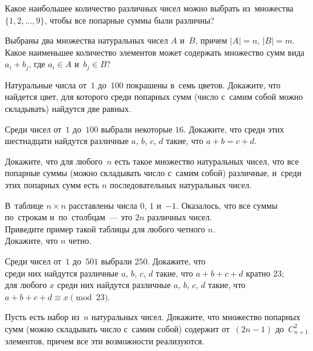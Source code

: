 


\begingroup
    \def\abs#1{\lvert #1 \rvert}%

\begin{problems}

\item
Какое наибольшее количество различных чисел можно выбрать из~множества
$\{ 1, 2, \ldots, 9 \}$, чтобы все попарные суммы были различны?

\item
Выбраны два множества натуральных чисел $A$ и~$B$, причем $\abs{A} = n$,
$\abs{B} = m$.
Какое наименьшее количество элементов может содержать множество сумм вида
$a_{i} + b_{j}$, где $a_{i} \in A$ и~$b_{j} \in B$?

\item
Натуральные числа от~$1$ до~$100$ покрашены в~семь цветов.
Докажите, что найдется цвет, для которого среди попарных сумм
(число с~самим собой можно складывать) найдутся две равных.

\item
Среди чисел от~$1$ до~$100$ выбрали некоторые $16$.
Докажите, что среди этих шестнадцати найдутся различные $a$, $b$, $c$, $d$
такие, что $a + b = c + d$.

\item
Докажите, что для любого~$n$ есть такое множество натуральных чисел, что все
попарные суммы (можно складывать число с~самим собой) различные, и~среди этих
попарных сумм есть $n$ последовательных натуральных чисел.

\item
В~таблице $n \times n$ расставлены числа $0$, $1$ и~$-1$.
Оказалось, что все суммы по~строкам и~по~столбцам~--- это $2 n$ различных
чисел.
\\
\subproblem
Приведите пример такой таблицы для любого четного $n$.
\\
\subproblem
Докажите, что $n$ четно.

\item
Среди чисел от~$1$ до~$501$ выбрали $250$.
Докажите, что
\\
\subproblem
среди них найдутся различные $a$, $b$, $c$, $d$ такие, что $a + b + c + d$
кратно $23$;
\\
\subproblem
для любого $x$ среди них найдутся различные $a$, $b$, $c$, $d$ такие, что
$a + b + c + d \equiv x \pmod{23}$.

\item
Пусть есть набор из~$n$ натуральных чисел.
Докажите, что множество попарных сумм (можно складывать число с~самим собой)
содержит от~$(2 n - 1)$ до~$C_{n+1}^{2}$ элементов, причем все эти возможности
реализуются.

\end{problems} %

\endgroup

